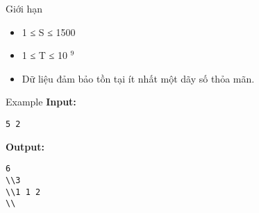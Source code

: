 Giới hạn
\begin{itemize}
	\item     1 ≤ S ≤ 1500   
	\item     1 ≤ T ≤ 10    $^     9    $
	\item     Dữ liệu đảm bảo tồn tại ít nhất một dãy số thỏa mãn.   
\end{itemize}
Example
\textbf{    Input:   }
\begin{verbatim}
5 2\end{verbatim}

\textbf{    Output:   }
\begin{verbatim}
6
\\3
\\1 1 2 
\\\end{verbatim}